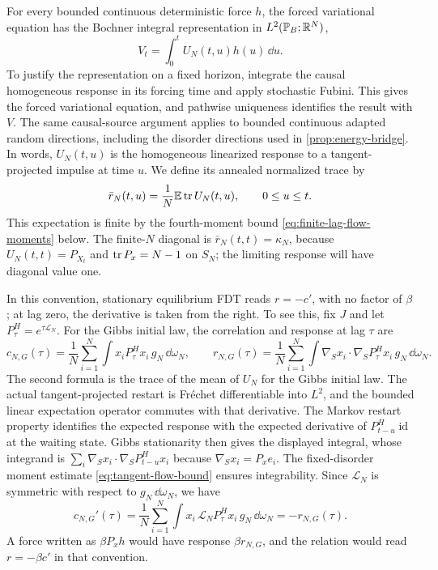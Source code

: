 For every bounded continuous deterministic force $h$, the forced variational equation has the Bochner integral representation in $L^2(\mathbb P_B;\mathbb R^N)$,
\begin{equation}\label{eq:response-variation}
 V_t=\int_0^tU_N(t,u)h(u)\,\dd u.
\end{equation}
To justify the representation on a fixed horizon, integrate the causal homogeneous response in its forcing time and apply stochastic Fubini. This gives the forced variational equation, and pathwise uniqueness identifies the result with $V$. The same causal-source argument applies to bounded continuous adapted random directions, including the disorder directions used in \cref{prop:energy-bridge}. In words, $U_N(t,u)$ is the homogeneous linearized response to a tangent-projected impulse at time $u$. We define its annealed normalized trace by
\begin{equation}\label{eq:annealed-response}
 \bar r_N(t,u)=\frac1N\mathbb E\operatorname{tr} U_N(t,u),\qquad 0\le u\le t.
\end{equation}
This expectation is finite by the fourth-moment bound \eqref{eq:finite-lag-flow-moments} below. The finite-$N$ diagonal is $\bar r_N(t,t)=\kappa_N$, because $U_N(t,t)=P_{X_t}$ and $\operatorname{tr} P_x=N-1$ on $S_N$; the limiting response will have diagonal value one.

\begin{remark}\label{rem:fdt-convention}
In this convention, stationary equilibrium FDT reads $r=-c'$, with no factor of $\beta$; at lag zero, the derivative is taken from the right. To see this, fix $J$ and let $P^H_\tau=e^{\tau\mathcal L_N}$. For the Gibbs initial law, the correlation and response at lag $\tau$ are
\[
 c_{N,G}(\tau)=\frac1N\sum_{i=1}^N\int x_iP^H_\tau x_i\,g_N\,\dd\omega_N,\qquad
 r_{N,G}(\tau)=\frac1N\sum_{i=1}^N\int\nabla_Sx_i\cdot\nabla_SP^H_\tau x_i\,g_N\,\dd\omega_N.
\]
The second formula is the trace of the mean of $U_N$ for the Gibbs initial law. The actual tangent-projected restart is Fr\'echet differentiable into $L^2$, and the bounded linear expectation operator commutes with that derivative. The Markov restart property identifies the expected response with the expected derivative of $P^H_{t-u}\operatorname{id}$ at the waiting state. Gibbs stationarity then gives the displayed integral, whose integrand is $\sum_i\nabla_Sx_i\cdot\nabla_SP^H_{t-u}x_i$ because $\nabla_Sx_i=P_xe_i$. The fixed-disorder moment estimate \eqref{eq:tangent-flow-bound} ensures integrability. Since $\mathcal L_N$ is symmetric with respect to $g_N\,\dd\omega_N$, we have
\[
 c_{N,G}'(\tau)=\frac1N\sum_{i=1}^N\int x_i\,\mathcal L_NP^H_\tau x_i\,g_N\,\dd\omega_N
 =-r_{N,G}(\tau).
\]
A force written as $\beta P_xh$ would have response $\beta r_{N,G}$, and the relation would read $r=-\beta c'$ in that convention.
\end{remark}


